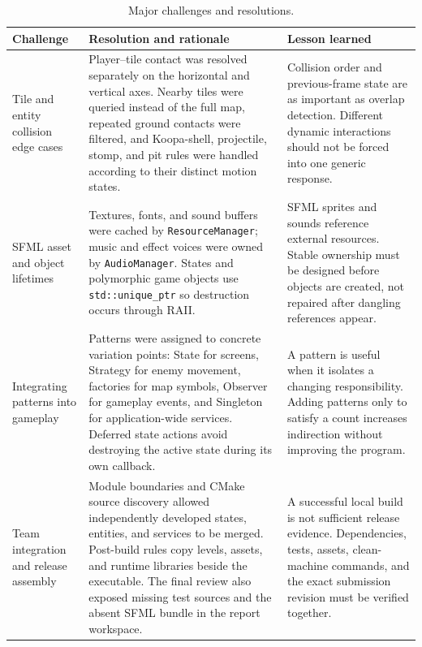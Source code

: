 \documentclass{template}
\begin{document}
\begin{table}[H]
    \centering
    \small
    \caption{Major challenges and resolutions.}
    \label{tab:challenges}
    \begin{tabularx}{\textwidth}{@{}
        >{\raggedright\arraybackslash}p{}
        >{\raggedright\arraybackslash}p{}
        >{\raggedright\arraybackslash}X@{}}
        \toprule
        \textbf{Challenge} & \textbf{Resolution and rationale} &
        \textbf{Lesson learned} \\
        \midrule
        Tile and entity collision edge cases & Player--tile contact was resolved
        separately on the horizontal and vertical axes. Nearby tiles were
        queried instead of the full map, repeated ground contacts were filtered,
        and Koopa-shell, projectile, stomp, and pit rules were handled according
        to their distinct motion states. & Collision order and previous-frame
        state are as important as overlap detection. Different dynamic
        interactions should not be forced into one generic response. \\
        SFML asset and object lifetimes & Textures, fonts, and sound buffers were
        cached by \texttt{ResourceManager}; music and effect voices were owned by
        \texttt{AudioManager}. States and polymorphic game objects use
        \texttt{std::unique\_ptr} so destruction occurs through RAII. & SFML
        sprites and sounds reference external resources. Stable ownership must
        be designed before objects are created, not repaired after dangling
        references appear. \\
        Integrating patterns into gameplay & Patterns were assigned to concrete
        variation points: State for screens, Strategy for enemy movement,
        factories for map symbols, Observer for gameplay events, and Singleton
        for application-wide services. Deferred state actions avoid destroying
        the active state during its own callback. & A pattern is useful when it
        isolates a changing responsibility. Adding patterns only to satisfy a
        count increases indirection without improving the program. \\
        Team integration and release assembly & Module boundaries and CMake
        source discovery allowed independently developed states, entities, and
        services to be merged. Post-build rules copy levels, assets, and runtime
        libraries beside the executable. The final review also exposed missing
        test sources and the absent SFML bundle in the report workspace. & A
        successful local build is not sufficient release evidence. Dependencies,
        tests, assets, clean-machine commands, and the exact submission revision
        must be verified together. \\
        \bottomrule
    \end{tabularx}
\end{table}
\end{document}
